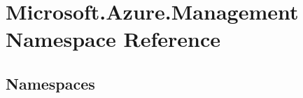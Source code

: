 \hypertarget{namespace_microsoft_1_1_azure_1_1_management}{}\section{Microsoft.\+Azure.\+Management Namespace Reference}
\label{namespace_microsoft_1_1_azure_1_1_management}
\subsection*{Namespaces}
\begin{DoxyCompactItemize}
\end{DoxyCompactItemize}
